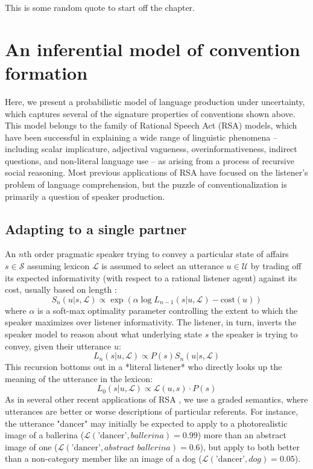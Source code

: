\begin{savequote}[75mm]
This is some random quote to start off the chapter.
\end{savequote}

\chapter{An inferential model of convention formation}
\graphicspath{{./figures/modeling/}}

Here, we present a probabilistic model of language production under uncertainty, which captures several of the signature properties of conventions shown above. 
This model belongs to the family of Rational Speech Act (RSA) models, which have been successful in explaining a wide range of linguistic phenomena -- including scalar implicature, adjectival vagueness, overinformativeness, indirect questions, and non-literal language use -- as arising from a process of recursive social reasoning. 
Most previous applications of RSA have focused on the listener's problem of language comprehension, but the puzzle of conventionalization is primarily a question of speaker production. 

\section{Adapting to a single partner}
An $n$th order pragmatic speaker trying to convey a particular state of affairs $s \in \mathcal{S}$ assuming lexicon $\mathcal{L}$ is assumed to select an utterance $u \in \mathcal{U}$ by trading off its expected informativity (with respect to a rational listener agent) against its cost, usually based on length \cite{GoodmanFrank16_RSATiCS}:
$$S_n(u | s, \mathcal{L}) \propto \exp{\left(\alpha \log L_{n-1}(s | u, \mathcal{L}) - \textrm{cost}(u)\right)}$$
where $\alpha$ is a soft-max optimality parameter controlling the extent to which the speaker maximizes over listener informativity. The listener, in turn, inverts the speaker model to reason about what underlying state $s$ the speaker is trying to convey, given their utterance $u$:
$$L_n(s | u, \mathcal{L}) \propto P(s) S_{n}(u | s, \mathcal{L})$$
\indent This recursion bottoms out in a *literal listener* who directly looks up the meaning of the utterance in the lexicon:
$$L_0(s | u, \mathcal{L}) \propto \mathcal{L}(u, s)\cdot P(s)$$
\indent As in several other recent applications of RSA \cite{GrafEtAl16_BasicLevel}, we use a graded semantics, where utterances are better or worse descriptions of particular referents. For instance, the utterance "dancer" may initially be expected to apply to a photorealistic image of a ballerina ($\mathcal{L}(\textrm{'dancer'}, \textit{ballerina}) = 0.99$) more than an abstract image of one ($\mathcal{L}(\textrm{'dancer'}, \textit{abstract ballerina}) =0.6$), but apply to both better than a non-category member like an image of a dog ($\mathcal{L}(\textrm{'dancer'}, \textit{dog}) = 0.05$).

